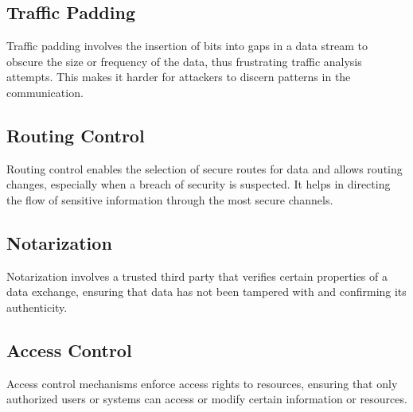 \subsection{Traffic Padding}
Traffic padding involves the insertion of bits into gaps in a data stream to obscure the size or frequency of the data, thus frustrating traffic analysis attempts. This makes it harder for attackers to discern patterns in the communication.

\subsection{Routing Control}
Routing control enables the selection of secure routes for data and allows routing changes, especially when a breach of security is suspected. It helps in directing the flow of sensitive information through the most secure channels.

\subsection{Notarization}
Notarization involves a trusted third party that verifies certain properties of a data exchange, ensuring that data has not been tampered with and confirming its authenticity.

\subsection{Access Control}
Access control mechanisms enforce access rights to resources, ensuring that only authorized users or systems can access or modify certain information or resources.

